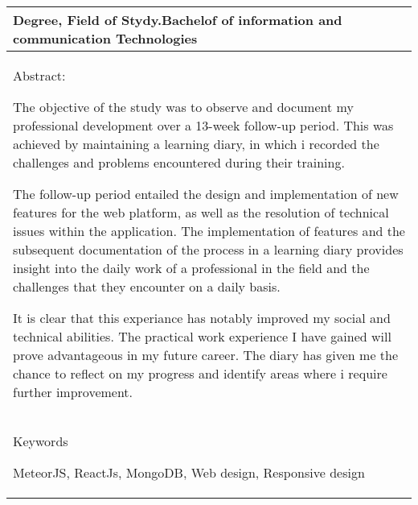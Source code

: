 \begin{tabular}{ | l | }
    \begin{minipage}[t][1.5cm][t]{10cm}
    Degree, Field of Stydy.\newline  Bachelof of information and communication Technologies

    \end{minipage}\\ \hline

    \begin{minipage}[t][7.5cm][t]{14.5cm}
    Abstract: \medskip 

    The objective of the study was to observe and document my professional development over a 13-week follow-up period.
        This was achieved by maintaining a learning diary, 
        in which i recorded the challenges and problems encountered during their training. \medskip

    The follow-up period entailed the design and implementation of new features for the web platform,
        as well as the resolution of technical issues within the application.
        The implementation of features and the subsequent documentation of the process in a learning diary provides insight into the daily work of a professional in the field and the challenges that they encounter on a daily basis. \medskip

    It is clear that this experiance has notably improved my social and technical abilities. 
        The practical work experience I have gained will prove advantageous in my future career.
        The diary has given me the chance to reflect on my progress and identify areas where i require further improvement.

    \end{minipage}\\ \hline

    \begin{minipage}[t][2cm][t]{14cm}
        Keywords
        \medskip

        MeteorJS, ReactJs, MongoDB, Web design, Responsive design 
    \end{minipage}\\ \hline

\end{tabular}
